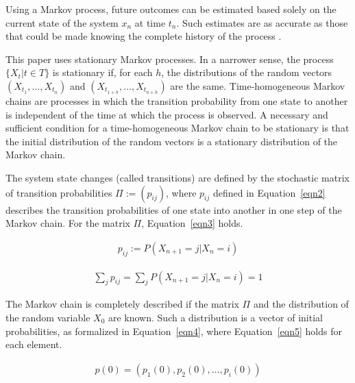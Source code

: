 \documentclass[preprint,12pt]{elsarticle}
\begin{document}
Using a Markov process, future outcomes can be estimated based solely on the current state of the system $x_{n}$ at time $t_{n}$. Such estimates are as accurate as those that could be made knowing the complete history of the process \citep{citeulike:1220946}.

This paper uses stationary Markov processes. In a narrower sense, the process $\{X_{t}|t\in T\}$ is stationary if, for each $h$, the distributions of the random vectors $(X_{t_{1}}, \dots, X_{t_{n}})$ and $(X_{t_{1 + h}}, \dots, X_{t_{n + h}})$ are the same. Time-homogeneous Markov chains are processes in which the transition probability from one state to another is independent of the time at which the process is observed. A necessary and sufficient condition for a time-homogeneous Markov chain to be stationary \citep{Gagniuc2017-jf} is that the initial distribution of the random vectors is a stationary distribution of the Markov chain.

The system state changes  (called transitions) \citep{Gagniuc} are defined by the stochastic matrix of transition probabilities $\Pi:=(p_{ij})$, where $p_{ij}$ defined in Equation~\ref{eqn2} describes the transition probabilities of one state into another in one step of the Markov chain. For the matrix $\Pi$, Equation~\ref{eqn3} holds.

\begin{equation} \label{eqn2}
    \begin{aligned}
       p_{ij}:=P(X_{n+1}=j|X_{n}=i)
    \end{aligned}
\end{equation}  

\begin{equation} \label{eqn3}
    \begin{aligned}
        \sum_{j}p_{ij}=\sum_{j}P(X_{n+1}=j|X_{n}=i)=1
    \end{aligned}
\end{equation}   

The Markov chain is completely described if the matrix $\Pi$ and the distribution of the random variable $X_{0}$ are known. Such a distribution is a vector of initial probabilities, as formalized in Equation~\ref{eqn4}, where Equation~\ref{eqn5} holds for each element.
  
\begin{equation} \label{eqn4}
    \begin{aligned}
     p(0)=(p_{1}(0),p_{2}(0), \dots, p_{i}(0))
    \end{aligned}
\end{equation}  
\end{document}
